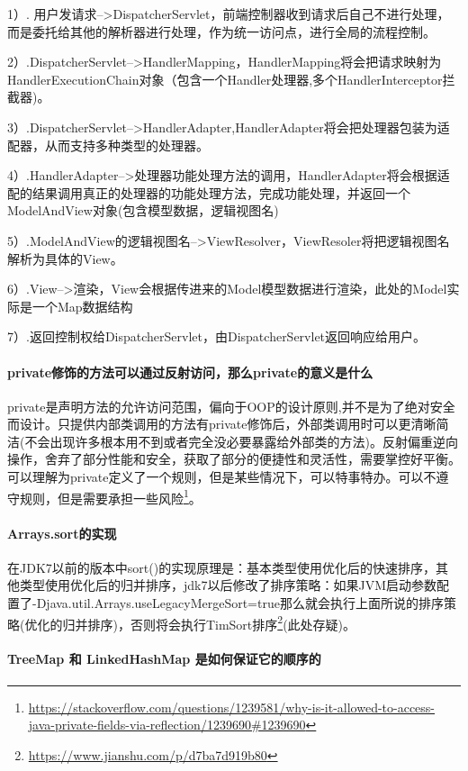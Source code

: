 \documentclass[../../../interview-questions.tex]{subfiles}
\begin{document}
1）. 用户发请求-->DispatcherServlet，前端控制器收到请求后自己不进行处理，而是委托给其他的解析器进行处理，作为统一访问点，进行全局的流程控制。

2）.DispatcherServlet-->HandlerMapping，HandlerMapping将会把请求映射为HandlerExecutionChain对象（包含一个Handler处理器,多个HandlerInterceptor拦截器)。

3）.DispatcherServlet-->HandlerAdapter,HandlerAdapter将会把处理器包装为适配器，从而支持多种类型的处理器。

4）.HandlerAdapter-->处理器功能处理方法的调用，HandlerAdapter将会根据适配的结果调用真正的处理器的功能处理方法，完成功能处理，并返回一个ModelAndView对象(包含模型数据，逻辑视图名)

5）.ModelAndView的逻辑视图名-->ViewResolver，ViewResoler将把逻辑视图名解析为具体的View。

6）.View-->渲染，View会根据传进来的Model模型数据进行渲染，此处的Model实际是一个Map数据结构

7）.返回控制权给DispatcherServlet，由DispatcherServlet返回响应给用户。

\paragraph{private修饰的方法可以通过反射访问，那么private的意义是什么}

private是声明方法的允许访问范围，偏向于OOP的设计原则,并不是为了绝对安全而设计。只提供内部类调用的方法有private修饰后，外部类调用时可以更清晰简洁(不会出现许多根本用不到或者完全没必要暴露给外部类的方法)。反射偏重逆向操作，舍弃了部分性能和安全，获取了部分的便捷性和灵活性，需要掌控好平衡。可以理解为private定义了一个规则，但是某些情况下，可以特事特办。可以不遵守规则，但是需要承担一些风险\footnote{\url{https://stackoverflow.com/questions/1239581/why-is-it-allowed-to-access-java-private-fields-via-reflection/1239690\#1239690}}。


\paragraph{Arrays.sort的实现}

在JDK7以前的版本中sort()的实现原理是：基本类型使用优化后的快速排序，其他类型使用优化后的归并排序，jdk7以后修改了排序策略：如果JVM启动参数配置了-Djava.util.Arrays.useLegacyMergeSort=true那么就会执行上面所说的排序策略(优化的归并排序)，否则将会执行TimSort排序\footnote{\url{https://www.jianshu.com/p/d7ba7d919b80}}(此处存疑)。

\paragraph{TreeMap 和 LinkedHashMap 是如何保证它的顺序的}
\end{document}
